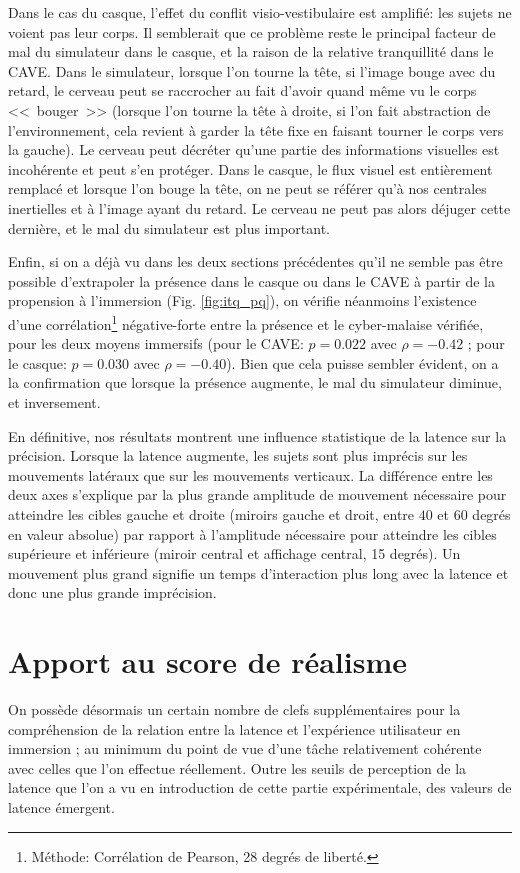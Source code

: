 	\par Dans le cas du casque, l'effet du conflit visio-vestibulaire est amplifié: les sujets ne voient pas leur corps. Il semblerait que ce problème reste le principal facteur de mal du simulateur dans le casque, et la raison de la relative tranquillité dans le CAVE. Dans le simulateur, lorsque l'on tourne la tête, si l'image bouge avec du retard, le cerveau peut se raccrocher au fait d'avoir quand même vu le corps <<~bouger~>> (lorsque l'on tourne la tête à droite, si l'on fait abstraction de l'environnement, cela revient à garder la tête fixe en faisant tourner le corps vers la gauche). Le cerveau peut décréter qu'une partie des informations visuelles est incohérente et peut s'en protéger. Dans le casque, le flux visuel est entièrement remplacé et lorsque l'on bouge la tête, on ne peut se référer qu'à nos centrales inertielles et à l'image ayant du retard. Le cerveau ne peut pas alors déjuger cette dernière, et le mal du simulateur est plus important.
	
	\par Enfin, si on a déjà vu dans les deux sections précédentes qu'il ne semble pas être possible d'extrapoler la présence dans le casque ou dans le CAVE à partir de la propension à l'immersion (Fig. \ref{fig:itq_pq}), on vérifie néanmoins l'existence d'une corrélation\footnote{Méthode: Corrélation de Pearson, 28 degrés de liberté.} négative-forte entre la présence et le cyber-malaise vérifiée, pour les deux moyens immersifs (pour le CAVE: $p = 0.022$ avec $\rho = -0.42$ ; pour le casque: $p = 0.030$ avec $\rho = -0.40$). Bien que cela puisse sembler évident, on a la confirmation que lorsque la présence augmente, le mal du simulateur diminue, et inversement.
	
	\par En définitive, nos résultats montrent une influence statistique de la latence sur la précision. Lorsque la latence augmente, les sujets sont plus imprécis sur les mouvements latéraux que sur les mouvements verticaux. La différence entre les deux axes s'explique par la plus grande amplitude de mouvement nécessaire pour atteindre les cibles gauche et droite (miroirs gauche et droit, entre $40$ et $60$ degrés en valeur absolue) par rapport à l'amplitude nécessaire pour atteindre les cibles supérieure et inférieure (miroir central et affichage central, 15 degrés). Un mouvement plus grand signifie un temps d'interaction plus long avec la latence et donc une plus grande imprécision.
	
	\section{Apport au score de réalisme}
	\par On possède désormais un certain nombre de clefs supplémentaires pour la compréhension de la relation entre la latence et l'expérience utilisateur en immersion ; au minimum du point de vue d'une tâche relativement cohérente avec celles que l'on effectue réellement. Outre les seuils de perception de la latence que l'on a vu en introduction de cette partie expérimentale, des valeurs de latence émergent.
	
